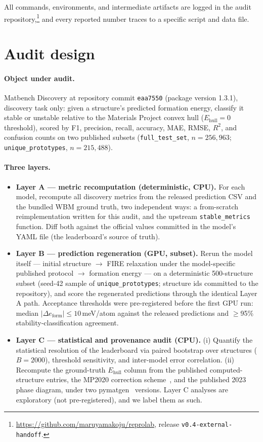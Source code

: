 \documentclass[11pt]{article}
\newcommand{\code}[1]{\texttt{#1}}
\newcommand{\meV}{\,meV/atom}
\begin{document}
All commands, environments, and intermediate artifacts are logged in the audit
repository,\footnote{\url{https://github.com/maruyamakoju/reprolab}, release
\code{v0.4-external-handoff}.} and every reported number traces to a specific
script and data file.

\section{Audit design}

\paragraph{Object under audit.} Matbench Discovery at repository commit
\code{eaa7550} (package version 1.3.1), discovery task only: given a
structure's predicted formation energy, classify it stable or unstable
relative to the Materials Project convex hull ($E_\mathrm{hull}=0$ threshold),
scored by F1, precision, recall, accuracy, MAE, RMSE, $R^2$, and confusion
counts on two published subsets (\code{full\_test\_set}, $n=256{,}963$;
\code{unique\_prototypes}, $n=215{,}488$).

\paragraph{Three layers.}
\begin{itemize}
\item \textbf{Layer A --- metric recomputation (deterministic, CPU).} For each
model, recompute all discovery metrics from the released prediction CSV and the
bundled WBM ground truth, two independent ways: a from-scratch
reimplementation written for this audit, and the upstream
\code{stable\_metrics} function. Diff both against the official values
committed in the model's YAML file (the leaderboard's source of truth).
\item \textbf{Layer B --- prediction regeneration (GPU, subset).} Rerun the
model itself --- initial structure $\to$ FIRE relaxation under the
model-specific published protocol $\to$ formation energy --- on a deterministic
500-structure subset (seed-42 sample of \code{unique\_prototypes}; structure
ids committed to the repository), and score the regenerated predictions
through the identical Layer A path. Acceptance thresholds were pre-registered
before the first GPU run: median $|\Delta e_\mathrm{form}| \le 10$\meV{}
against the released predictions and $\ge$95\% stability-classification
agreement.
\item \textbf{Layer C --- statistical and provenance audit (CPU).}
(i) Quantify the statistical resolution of the leaderboard via paired
bootstrap over structures ($B=2000$), threshold sensitivity, and inter-model
error correlation. (ii) Recompute the ground-truth
$E_\mathrm{hull}$ column from the published computed-structure entries, the
MP2020 correction scheme~\cite{wang2021corrections}, and the published 2023
phase diagram, under two pymatgen~\cite{ong2013} versions. Layer C analyses
are exploratory (not pre-registered), and we label them as such.
\end{itemize}
\end{document}
